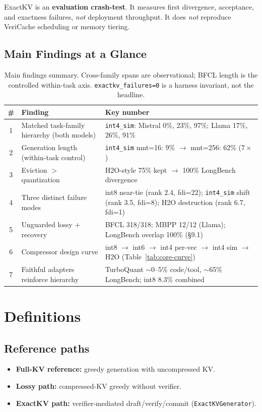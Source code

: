 \documentclass[11pt]{article}
\begin{document}
ExactKV is an \textbf{evaluation crash-test}. It measures first divergence,
acceptance, and exactness failures, \emph{not} deployment throughput. It does
\emph{not} reproduce VeriCache scheduling or memory tiering.

\subsection{Main Findings at a Glance}

\begin{table}[htbp]
\centering\small
\begin{tabularx}{\textwidth}{@{}c>{\raggedright\arraybackslash}p{3.6cm}X@{}}
\toprule
\textbf{\#} & \textbf{Finding} & \textbf{Key number} \\
\midrule
1 & Matched task-family hierarchy (both models)
  & \texttt{int4\_sim}: Mistral 0\%, 23\%, 97\%; Llama 17\%, 26\%, 91\% \\
2 & Generation length (within-task control)
  & \texttt{int4\_sim} mnt=16: 9\% $\to$ mnt=256: 62\% ($7\times$) \\
3 & Eviction $>$ quantization
  & H2O-style 75\% kept $\to$ 100\% LongBench divergence \\
4 & Three distinct failure modes
  & int8 near-tie (rank 2.4, fdi=22); \texttt{int4\_sim} shift (rank 3.5, fdi=8);
    H2O destruction (rank 6.7, fdi=1) \\
5 & Unguarded lossy + recovery
  & BFCL 318/318; MBPP 12/12 (Llama); LongBench overlap 100\% (\S9.1) \\
6 & Compressor design curve
  & int8 $\to$ int6 $\to$ int4 per-vec $\to$ int4 sim $\to$ H2O
    (Table~\ref{tab:core-curve}) \\
7 & Faithful adapters reinforce hierarchy
  & TurboQuant $\sim$0--5\% code/tool, $\sim$65\% LongBench; int8 8.3\% combined \\
\bottomrule
\end{tabularx}
\caption{Main findings summary. Cross-family spans are observational; BFCL length is
the controlled within-task axis. \texttt{exactkv\_failures=0} is a harness invariant,
not the headline.}
\end{table}

\section{Definitions}
\subsection{Reference paths}
\begin{itemize}[noitemsep]
\item \textbf{Full-KV reference:} greedy generation with uncompressed KV.
\item \textbf{Lossy path:} compressed-KV greedy without verifier.
\item \textbf{ExactKV path:} verifier-mediated draft/verify/commit (\texttt{ExactKVGenerator}).
\end{itemize}
\end{document}
